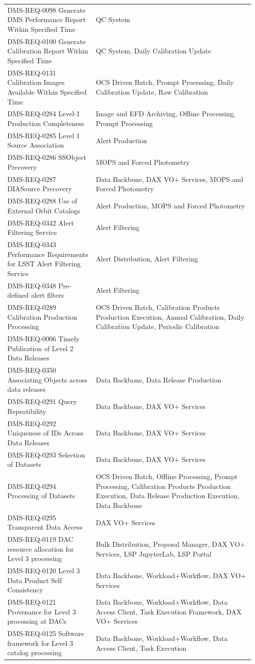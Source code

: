 \documentclass[DM,lsstdraft,toc]{lsstdoc}
\begin{document}
\begin{longtable}[]{@{}ll@{}}
DMS-REQ-0098 Generate DMS Performance Report Within Specified Time & QC
System\tabularnewline
DMS-REQ-0100 Generate Calibration Report Within Specified Time & QC
System, Daily Calibration Update\tabularnewline
DMS-REQ-0131 Calibration Images Available Within Specified Time & OCS
Driven Batch, Prompt Processing, Daily Calibration Update, Raw
Calibration\tabularnewline
DMS-REQ-0284 Level-1 Production Completeness & Image and EFD Archiving,
Offline Processing, Prompt Processing\tabularnewline
DMS-REQ-0285 Level 1 Source Association & Alert
Production\tabularnewline
DMS-REQ-0286 SSObject Precovery & MOPS and Forced
Photometry\tabularnewline
DMS-REQ-0287 DIASource Precovery & Data Backbone, DAX VO+ Services, MOPS
and Forced Photometry\tabularnewline
DMS-REQ-0288 Use of External Orbit Catalogs & Alert Production, MOPS and
Forced Photometry\tabularnewline
DMS-REQ-0342 Alert Filtering Service & Alert Filtering\tabularnewline
DMS-REQ-0343 Performance Requirements for LSST Alert Filtering Service &
Alert Distribution, Alert Filtering\tabularnewline
DMS-REQ-0348 Pre-defined alert filters & Alert Filtering\tabularnewline
DMS-REQ-0289 Calibration Production Processing & OCS Driven Batch,
Calibration Products Production Execution, Annual Calibration, Daily
Calibration Update, Periodic Calibration\tabularnewline
DMS-REQ-0006 Timely Publication of Level 2 Data Releases
&\tabularnewline
DMS-REQ-0350 Associating Objects across data releases & Data Backbone,
Data Release Production\tabularnewline
DMS-REQ-0291 Query Repeatibility & Data Backbone, DAX VO+
Services\tabularnewline
DMS-REQ-0292 Uniqueness of IDs Across Data Releases & Data Backbone, DAX
VO+ Services\tabularnewline
DMS-REQ-0293 Selection of Datasets & Data Backbone, DAX VO+
Services\tabularnewline
DMS-REQ-0294 Processing of Datasets & OCS Driven Batch, Offline
Processing, Prompt Processing, Calibration Products Production
Execution, Data Release Production Execution, Data
Backbone\tabularnewline
DMS-REQ-0295 Transparent Data Access & DAX VO+ Services\tabularnewline
DMS-REQ-0119 DAC resource allocation for Level 3 processing & Bulk
Distribution, Proposal Manager, DAX VO+ Services, LSP JupyterLab, LSP
Portal\tabularnewline
DMS-REQ-0120 Level 3 Data Product Self Consistency & Data Backbone,
Workload+Workflow, DAX VO+ Services\tabularnewline
DMS-REQ-0121 Provenance for Level 3 processing at DACs & Data Backbone,
Workload+Workflow, Data Access Client, Task Execution Framework, DAX VO+
Services\tabularnewline
DMS-REQ-0125 Software framework for Level 3 catalog processing & Data
Backbone, Workload+Workflow, Data Access Client, Task Execution

\end{longtable}
\end{document}
